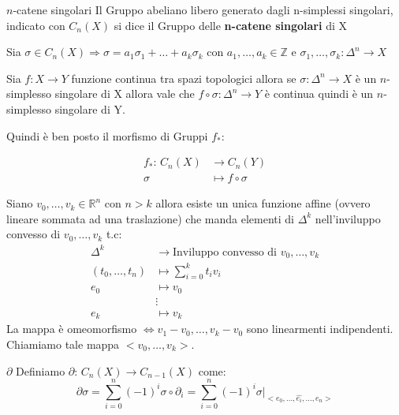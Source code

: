 \documentclass[11pt, a4paper, twoside]{article}
\begin{document}
\begin{defn}{$n$-catene singolari}{} \label{catene singolari}
	Il Gruppo abeliano libero generato dagli n-simplessi singolari, indicato con $C_n(X)$ si dice il Gruppo delle \textbf{n-catene singolari} di X
\end{defn}
 
\begin{oss}
	Sia $\sigma\in C_n(X)\Rightarrow\sigma=a_1\sigma_1+\dots+a_k\sigma_k$ con $a_1,\dots,a_k\in\mathbb{Z}$ e $\sigma_1,\dots,\sigma_k:\Delta^n\rightarrow X$
\end{oss}

\begin{oss}
	Sia $f:X\rightarrow Y$ funzione continua tra spazi topologici allora se $\sigma :\Delta^n\rightarrow X$ è un $n$-simplesso singolare di X allora vale che $f\circ\sigma :\Delta^n\rightarrow Y$ è continua quindi è un $n$-simplesso singolare di Y.

	Quindi è ben posto il morfismo di Gruppi $f_*$: 

	\begin{align*}
		f_* :\,  C_n(X)&\rightarrow C_n(Y)\\
			\sigma&\mapsto f\circ\sigma 
	\end{align*}

\end{oss}

\begin{oss}
	Siano $v_0,\dots,v_k\in\mathbb{R}^n$ con $n>k$ allora esiste un unica funzione affine (ovvero lineare sommata ad una traslazione) che manda elementi di $\Delta^k$ nell'inviluppo convesso di $v_0,\dots,v_k$ t.c:
	\begin{align*}
		\Delta^k&\rightarrow\text{Inviluppo convesso di }v_0,\dots,v_k\\
		(t_0,\dots,t_n)&\mapsto \sum\limits_{i=0}^k t_i v_i\\
		e_0&\mapsto v_0\\
		&\vdots\\
		e_k&\mapsto v_k
	\end{align*}
	La mappa è omeomorfismo $\iff v_1-v_0,\dots,v_k-v_0$ sono linearmenti indipendenti. 
	Chiamiamo tale mappa $<v_0,\dots,v_k>$.
\end{oss}
\begin{defn}{$\partial$}{}\label{partial}
	Definiamo $\partial:\,C_n(X)\rightarrow C_{n-1}(X)$ come:
	\[
		\partial\sigma=\sum\limits_{i=0}^{n}(-1)^i\sigma\circ\partial_i=\sum\limits_{i=0}^{n}(-1)^i\sigma\vert_{<e_0,\dots,\hat{e_i},\dots,e_n>}
	\]
\end{defn}
\end{document}
